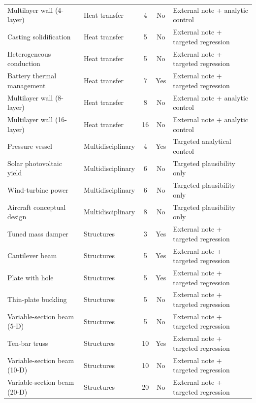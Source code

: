\begin{table}[htbp]
\begin{tabular}{@{}llccl@{}}
Multilayer wall (4-layer) & Heat transfer & 4 & No & External note + analytic control \\
Casting solidification & Heat transfer & 5 & No & External note + targeted regression \\
Heterogeneous conduction & Heat transfer & 5 & No & External note + targeted regression \\
Battery thermal management & Heat transfer & 7 & Yes & External note + targeted regression \\
Multilayer wall (8-layer) & Heat transfer & 8 & No & External note + analytic control \\
Multilayer wall (16-layer) & Heat transfer & 16 & No & External note + analytic control \\
Pressure vessel & Multidisciplinary & 4 & Yes & Targeted analytical control \\
Solar photovoltaic yield & Multidisciplinary & 6 & No & Targeted plausibility only \\
Wind-turbine power & Multidisciplinary & 6 & No & Targeted plausibility only \\
Aircraft conceptual design & Multidisciplinary & 8 & No & Targeted plausibility only \\
Tuned mass damper & Structures & 3 & Yes & External note + targeted regression \\
Cantilever beam & Structures & 5 & Yes & External note + targeted regression \\
Plate with hole & Structures & 5 & Yes & External note + targeted regression \\
Thin-plate buckling & Structures & 5 & No & External note + targeted regression \\
Variable-section beam (5-D) & Structures & 5 & No & External note + targeted regression \\
Ten-bar truss & Structures & 10 & Yes & External note + targeted regression \\
Variable-section beam (10-D) & Structures & 10 & No & External note + targeted regression \\
Variable-section beam (20-D) & Structures & 20 & No & External note + targeted regression \\
\bottomrule
\end{tabular}
\end{table}
